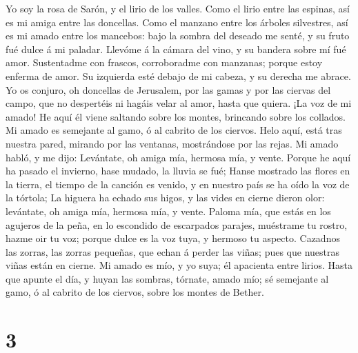 Yo soy la rosa de Sarón, y el lirio de los valles.
 Como el lirio entre las espinas, así es mi amiga entre las
doncellas.  Como el manzano entre los árboles silvestres,
así es mi amado entre los mancebos: bajo la sombra del deseado me senté,
y su fruto fué dulce á mi paladar.  Llevóme á la cámara del
vino, y su bandera sobre mí fué amor.  Sustentadme con
frascos, corroboradme con manzanas; porque estoy enferma de amor.
 Su izquierda esté debajo de mi cabeza, y su derecha me
abrace.  Yo os conjuro, oh doncellas de Jerusalem, por las
gamas y por las ciervas del campo, que no despertéis ni hagáis velar al
amor, hasta que quiera.  ¡La voz de mi amado! He aquí él
viene saltando sobre los montes, brincando sobre los collados.
 Mi amado es semejante al gamo, ó al cabrito de los ciervos.
Helo aquí, está tras nuestra pared, mirando por las ventanas,
mostrándose por las rejas.  Mi amado habló, y me dijo:
Levántate, oh amiga mía, hermosa mía, y vente.  Porque he
aquí ha pasado el invierno, hase mudado, la lluvia se fué; 
Hanse mostrado las flores en la tierra, el tiempo de la canción es
venido, y en nuestro país se ha oído la voz de la tórtola; 
La higuera ha echado sus higos, y las vides en cierne dieron olor:
levántate, oh amiga mía, hermosa mía, y vente.  Paloma mía,
que estás en los agujeros de la peña, en lo escondido de escarpados
parajes, muéstrame tu rostro, hazme oir tu voz; porque dulce es la voz
tuya, y hermoso tu aspecto.  Cazadnos las zorras, las
zorras pequeñas, que echan á perder las viñas; pues que nuestras viñas
están en cierne.  Mi amado es mío, y yo suya; él apacienta
entre lirios.  Hasta que apunte el día, y huyan las
sombras, tórnate, amado mío; sé semejante al gamo, ó al cabrito de los
ciervos, sobre los montes de Bether.

\hypertarget{section-2}{%
\section{3}\label{section-2}}

